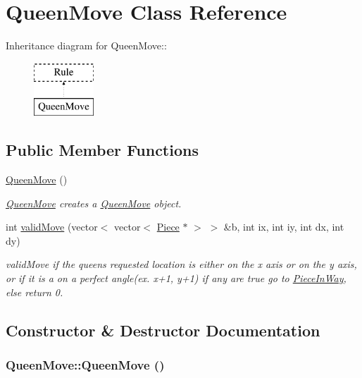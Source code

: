 \hypertarget{classQueenMove}{
\section{QueenMove Class Reference}
\label{classQueenMove}
}
Inheritance diagram for QueenMove::\begin{figure}[H]
\begin{center}
\leavevmode
\includegraphics[height=2cm]{classQueenMove}
\end{center}
\end{figure}
\subsection*{Public Member Functions}
\begin{DoxyCompactItemize}
\item 
\hyperlink{classQueenMove_a62bbd2eb2e49ba93b7144403cfc8eb46}{QueenMove} ()
\begin{DoxyCompactList}\small\item\em \hyperlink{classQueenMove}{QueenMove} creates a \hyperlink{classQueenMove}{QueenMove} object. \item\end{DoxyCompactList}\item 
int \hyperlink{classQueenMove_a20dad2546b24626a9c00e5c3b3369065}{validMove} (vector$<$ vector$<$ \hyperlink{classPiece}{Piece} $\ast$ $>$ $>$ \&b, int ix, int iy, int dx, int dy)
\begin{DoxyCompactList}\small\item\em validMove if the queens requested location is either on the x axis or on the y axis, or if it is a on a perfect angle(ex. x+1, y+1) if any are true go to \hyperlink{classPieceInWay}{PieceInWay}, else return 0. \item\end{DoxyCompactList}\end{DoxyCompactItemize}


\subsection{Constructor \& Destructor Documentation}
\hypertarget{classQueenMove_a62bbd2eb2e49ba93b7144403cfc8eb46}{
\subsubsection[{QueenMove}]{\setlength{\rightskip}{0pt plus 5cm}QueenMove::QueenMove ()}}
\label{classQueenMove_a62bbd2eb2e49ba93b7144403cfc8eb46}


